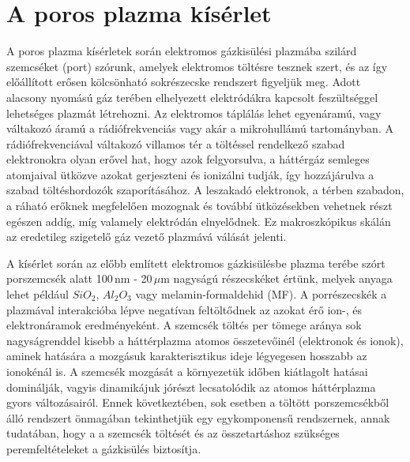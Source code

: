 \chapter{A poros plazma kísérlet}


	A poros plazma kísérletek során elektromos gázkisülési
        plazmába szilárd szemcséket (port) szórunk, amelyek
        elektromos töltésre tesznek szert, és az így
        előállított erősen kölcsönható sokrészecske rendszert
        figyeljük meg. Adott alacsony nyomású gáz terében elhelyezett
        elektródákra kapcsolt feszültséggel  
	lehetséges plazmát létrehozni. Az elektromos táplálás lehet
        egyenáramú, vagy váltakozó áramú a rádiófrekvenciás vagy akár
        a mikrohullámú tartományban. A rádiófrekvenciával váltakozó
        villamos tér a töltéssel rendelkező szabad elektronokra 
	olyan erővel hat, hogy azok felgyorsulva, a háttérgáz semleges
        atomjaival ütközve azokat gerjeszteni és ionizálni tudják, így
        hozzájárulva a szabad töltéshordozók szaporításához.
	A leszakadó elektronok, a térben szabadon, a ráható erőknek
        megfelelően mozognak és továbbí ütközésekben vehetnek részt
        egészen addíg, míg valamely elektródán elnyelődnek.
	Ez makroszkópikus skálán az eredetileg szigetelő gáz vezető
        plazmává válását jelenti.  

        A kísérlet során az előbb említett elektromos gázkisülésbe plazma terébe szórt porszemcsék alatt
	100\,nm - 20\,$\mu$m nagyságú részecskéket értünk, melyek anyaga
        lehet például $SiO_2$, $Al_2O_3$ vagy 
	melamin-formaldehid (MF). A porrészecskék a plazmával
        interakcióba lépve negatívan feltöltődnek az azokat érő ion-,
        és elektronáramok eredményeként. A szemcsék töltés per tömege
        aránya sok nagyságrenddel kisebb a háttérplazma atomos
        összetevőinél (elektronok és ionok),
        aminek hatására a mozgásuk karakterisztikus ideje légyegesen
        hosszabb az ionokénál is. A szemcsék
        mozgását a környezetük időben kiátlagolt hatásai dominálják,
        vagyis dinamikájuk jórészt lecsatolódik az atomos háttérplazma
        gyors változásairól. Ennek következtében, sok esetben a
        töltött porszemcsékből álló rendszert önmagában tekinthetjük
        egy egykomponensű rendszernek, annak tudatában, hogy a
        a szemcsék töltését és az összetartáshoz szükséges
        peremfeltételeket a gázkisülés biztosítja.
	

